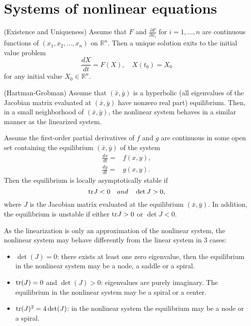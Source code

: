 \section{Systems of nonlinear equations}
\begin{theorem}(Existence and Uniqueness)
Assume that $F$ and $\frac{\partial F}{\partial x_i}$ for $i=1,\dots, n$ are continuous functions of $(x_1,x_2,\dots , x_n)$ on $\mathbb{R}^n$. Then a unique solution exits to the initial value problem
$$\frac{dX}{dt}=F(X), \quad X(t_0)=X_0$$
for any initial value $X_0\in \mathbb{R}^n$.
\end{theorem}

\begin{theorem} (Hartman-Grobman)
Assume that $(\bar x, \bar y)$ is a hyperbolic (all eigenvalues of the Jacobian matrix evaluated at $(\bar x,\bar y)$ have nonzero real part) equilibrium. Then, in a small neighborhood of $(\bar x, \bar y)$, the nonlinear system 
behaves in a similar manner as the linearized system.
\end{theorem}


\begin{theorem}
Assume the first-order partial derivatives of $f$ and $g$ are continuous in some open set containing the equilibrium $(\bar x,\bar y)$ of the system
$$
\begin{array}{ll}
\frac{dx}{dt}=& f(x,y),\\
\frac{dy}{dt}=& g(x,y).
\end{array}
$$
Then the equilibrium is locally asymptotically stable if
$$\textrm{tr} J <0 \quad and \quad \det J >0,$$
where $J$ is the Jacobian matrix evaluated at the equilibrium $(\bar x,\bar y)$. In addition, the equilibrium is unstable if either $\textrm{tr} J >0$ or $\det J<0$.
\end{theorem}

As the linearization is only an approximation of the nonlinear system, the nonlinear system may behave differently from the linear system in 3 cases:
\begin{itemize}
\item $\det (J)=0$: there exists at least one zero eigenvalue, then the equilibrium in the nonlinear system may be a node, a saddle or a spiral.
\item $\textrm{tr}(J)=0$ and $\det (J)>0$: eigenvalues are purely imaginary. The equilibrium in the nonlinear system may be a spiral or a center.
\item $\textrm{tr} (J)^2=4\det (J)$: in the nonlinear system the equilibrium may be a node or a spiral.
\end{itemize}



